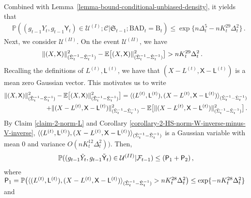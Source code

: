 \documentclass[11pt]{article}
\numberwithin{equation}{section}
\begin{document}
Combined with Lemma~\ref{lemma-bound-conditional-unbiased-density}, it yields that
\begin{align}
    & \mathbb{P} ( (g_{t-1} Y_t, g_{t-1} \mathsf{Y}_t) \in \mathcal{U}^{(I)}; \mathcal{C} | \mathfrak{S}_{t-1}; \mathrm{BAD}_t = \mathrm{B}_t ) \leq \exp \big\{ n \Delta_t^5 - n K_{t}^{29} \Delta_t^2 \big\} \,.
    \label{equ-prob-subbad-event-1}
\end{align}
Next, we consider $ \mathcal{U}^{(II)} $. On the event $\mathcal{U}^{(II)}$, we have
\begin{align*}
    & \| (X,\mathsf{X}) \|^2_{ ( \Tilde{\Sigma}_{t}^{-1} - \Check{\Sigma}_{t}^{-1} ) } - \mathbb{E} \big[ (X,\mathsf{X}) \|^2_{ ( \Tilde{\Sigma}_{t}^{-1} - \Check{\Sigma}_{t}^{-1} ) } \big] > n K_{t}^{29} \Delta_{t}^2\,.
\end{align*}
Recalling the definitions of $L^{(t)},\mathsf{L}^{(t)}$, we have that $(X-L^{(t)},\mathsf{X}-\mathsf{L}^{(t)})$ is a mean zero Gaussian vector. This motivates us to write
\begin{align*}
    \| (X,\mathsf{X}) \|^2_{ ( \Tilde{\Sigma}_{t}^{-1} - \Check{\Sigma}_{t}^{-1} ) } - \mathbb{E} \big[ (X,\mathsf{X}) \|^2_{ ( \Tilde{\Sigma}_{t}^{-1} - \Check{\Sigma}_{t}^{-1} ) } \big] = \langle (L^{(t)},\mathsf{L}^{(t)}), (X-L^{(t)},\mathsf{X}-\mathsf{L}^{(t)}) \rangle_{ ( \Tilde{\Sigma}_{t}^{-1} - \Check{\Sigma}_{t}^{-1} ) } \\ 
    + \| (X-L^{(t)},\mathsf{X}-\mathsf{L}^{(t)}) \|^2_{ ( \Tilde{\Sigma}_{t}^{-1} - \Check{\Sigma}_{t}^{-1} ) } - \mathbb{E} \big[ \| (X-L^{(t)},\mathsf{X}-\mathsf{L}^{(t)}) \|^2_{ ( \Tilde{\Sigma}_{t}^{-1} - \Check{\Sigma}_{t}^{-1} ) } \big] \,.
\end{align*}
By Claim \ref{claim-2-norm-L} and Corollary \ref{corollary-2-HS-norm-W-inverse-minus-V-inverse}, $\langle (L^{(t)},\mathsf{L}^{(t)}), (X-L^{(t)},\mathsf{X}-\mathsf{L}^{(t)}) \rangle_{ ( \Tilde{\Sigma}_{t}^{-1} - \Check{\Sigma}_{t}^{-1} ) }$ is a Gaussian variable with mean 0 and variance $ O(n K_{t}^{12} \Delta_{t}^2))$. Then,
\begin{align}\label{eq-prob-U-II-reduction}
    \mathbb{P} ( (g_{t-1} \Tilde{Y}_t,  g_{t-1} \Tilde{\mathsf{Y}}_t) \in \mathcal{U}^{(II)} | \mathcal{F}_{t-1} ) \leq  ( \mathsf P_1 + \mathsf P_2 ) \,,
 \end{align}
where $\mathsf P_1 =\mathbb{P} \big( \langle (L^{(t)},\mathsf{L}^{(t)}), (X-L^{(t)},\mathsf{X}-\mathsf{L}^{(t)}) \rangle_{ ( \Tilde{\Sigma}_{t}^{-1} - \Check{\Sigma}_{t}^{-1} ) } > n K_t^{28} \Delta_t^2 \big)  \leq \exp \{ - n K_t^{28} \Delta_t^2 \}$ and 
\end{document}
